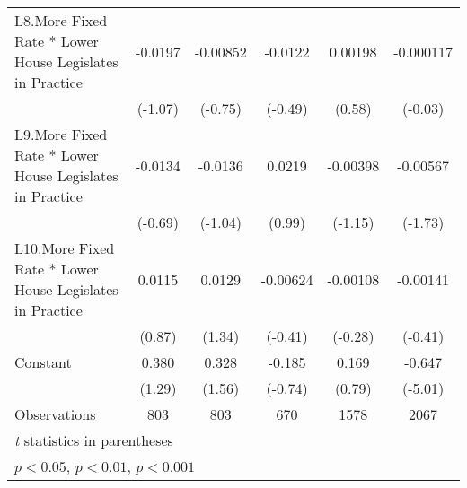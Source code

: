 {\begin{longtable}{l*{5}{c}}
\addlinespace
L8.More Fixed Rate * Lower House Legislates in Practice&  -0.0197         & -0.00852         &  -0.0122         &  0.00198         &-0.000117         \\
                &  (-1.07)         &  (-0.75)         &  (-0.49)         &   (0.58)         &  (-0.03)         \\
\addlinespace
L9.More Fixed Rate * Lower House Legislates in Practice&  -0.0134         &  -0.0136         &   0.0219         & -0.00398         & -0.00567         \\
                &  (-0.69)         &  (-1.04)         &   (0.99)         &  (-1.15)         &  (-1.73)         \\
\addlinespace
L10.More Fixed Rate * Lower House Legislates in Practice&   0.0115         &   0.0129         & -0.00624         & -0.00108         & -0.00141         \\
                &   (0.87)         &   (1.34)         &  (-0.41)         &  (-0.28)         &  (-0.41)         \\
\addlinespace
Constant        &    0.380         &    0.328         &   -0.185         &    0.169         &   -0.647\sym{***}\\
                &   (1.29)         &   (1.56)         &  (-0.74)         &   (0.79)         &  (-5.01)         \\
\midrule
Observations    &      803         &      803         &      670         &     1578         &     2067         \\
\bottomrule
\multicolumn{6}{l}{\footnotesize \textit{t} statistics in parentheses}\\
\multicolumn{6}{l}{\footnotesize \sym{*} \(p<0.05\), \sym{**} \(p<0.01\), \sym{***} \(p<0.001\)}\\
\end{longtable}
}
